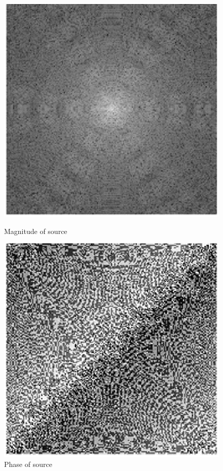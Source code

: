 \documentclass{article}
\begin{document}
\begin{figure}[!phbt]
\begin{minipage}{.3\linewidth}
    	\includegraphics[width= \linewidth]{img/magnitudeimage.eps}
    	\caption{Magnitude of source}
    	\label{fig:magnitudeimage}
    \end{minipage}
    \begin{minipage}{.3\linewidth}
    	\centering
    	\includegraphics[width= \linewidth]{img/phaseimage.eps}
    	\caption{Phase of source}
    	\label{fig:phaseimage}
    \end{minipage}
\end{figure}
\end{document}
